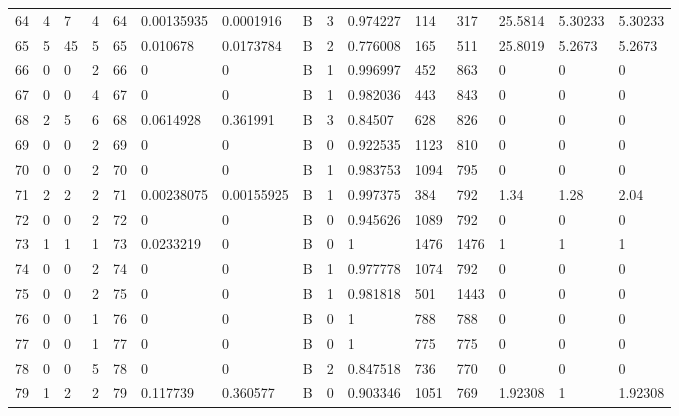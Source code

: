 \begin{latin}
\begin{longtable}{lllllllllllllll}
	64  & 4  & 7   & 4  & 64  & 0.00135935     & 0.0001916      & B & 3  & 0.974227 & 114  & 317  & 25.5814 & 5.30233 & 5.30233 \\
	65  & 5  & 45  & 5  & 65  & 0.010678       & 0.0173784      & B & 2  & 0.776008 & 165  & 511  & 25.8019 & 5.2673  & 5.2673  \\
	66  & 0  & 0   & 2  & 66  & 0              & 0              & B & 1  & 0.996997 & 452  & 863  & 0       & 0       & 0       \\
	67  & 0  & 0   & 4  & 67  & 0              & 0              & B & 1  & 0.982036 & 443  & 843  & 0       & 0       & 0       \\
	68  & 2  & 5   & 6  & 68  & 0.0614928      & 0.361991       & B & 3  & 0.84507  & 628  & 826  & 0       & 0       & 0       \\
	69  & 0  & 0   & 2  & 69  & 0              & 0              & B & 0  & 0.922535 & 1123 & 810  & 0       & 0       & 0       \\
	70  & 0  & 0   & 2  & 70  & 0              & 0              & B & 1  & 0.983753 & 1094 & 795  & 0       & 0       & 0       \\
	71  & 2  & 2   & 2  & 71  & 0.00238075     & 0.00155925     & B & 1  & 0.997375 & 384  & 792  & 1.34    & 1.28    & 2.04    \\
	72  & 0  & 0   & 2  & 72  & 0              & 0              & B & 0  & 0.945626 & 1089 & 792  & 0       & 0       & 0       \\
	73  & 1  & 1   & 1  & 73  & 0.0233219      & 0              & B & 0  & 1        & 1476 & 1476 & 1       & 1       & 1       \\
	74  & 0  & 0   & 2  & 74  & 0              & 0              & B & 1  & 0.977778 & 1074 & 792  & 0       & 0       & 0       \\
	75  & 0  & 0   & 2  & 75  & 0              & 0              & B & 1  & 0.981818 & 501  & 1443 & 0       & 0       & 0       \\
	76  & 0  & 0   & 1  & 76  & 0              & 0              & B & 0  & 1        & 788  & 788  & 0       & 0       & 0       \\
	77  & 0  & 0   & 1  & 77  & 0              & 0              & B & 0  & 1        & 775  & 775  & 0       & 0       & 0       \\
	78  & 0  & 0   & 5  & 78  & 0              & 0              & B & 2  & 0.847518 & 736  & 770  & 0       & 0       & 0       \\
	79  & 1  & 2   & 2  & 79  & 0.117739       & 0.360577       & B & 0  & 0.903346 & 1051 & 769  & 1.92308 & 1       & 1.92308 \\

\end{longtable}
\end{latin}

